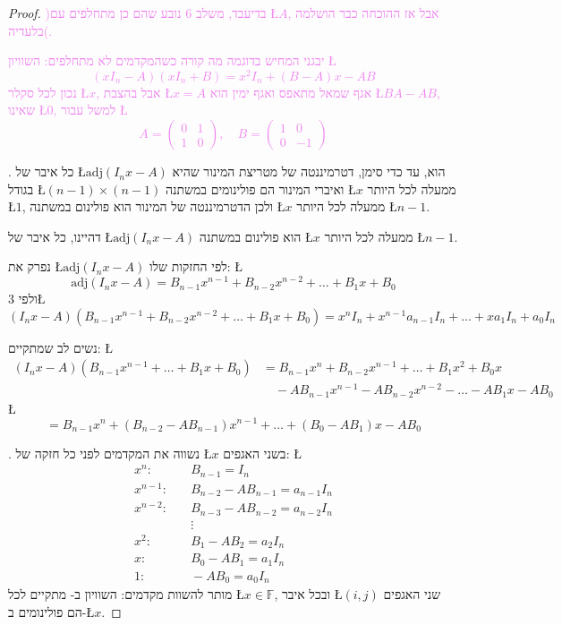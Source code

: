 \documentclass[english,hebrew]{article}
\begin{document}
\begin{proof}
\textcolor{violet}{)בדיעבד, משלב 6 נובע שהם כן מתחלפים עם \L{$A$},
אבל אז ההוכחה כבר הושלמה בלעדיה(.}

\textcolor{violet}{יבגני המחיש בדוגמה מה קורה כשהמקדמים לא מתחלפים:
השוויון \L{%
\[
(xI_{n}-A)(xI_{n}+B)=x^{2}I_{n}+(B-A)x-AB
\]
}%
נכון לכל סקלר \L{$x$}, אבל בהצבת \L{$x=A$} אגף שמאל מתאפס ואגף ימין
הוא \L{$BA-AB$}, שאינו \L{$0$}, למשל עבור \L{%
\[
A=\begin{pmatrix}0 & 1\\
1 & 0
\end{pmatrix},\quad B=\begin{pmatrix}1 & 0\\
0 & -1
\end{pmatrix}
\]
}%
}

{\endL}. כל איבר של \L{$\text{adj}(I_{n}x-A)$} הוא, עד כדי
סימן, דטרמיננטה של מטריצת המינור שהיא בגודל \L{$(n-1)\times(n-1)$}
ואיברי המינור הם פולינומים במשתנה \L{$x$} ממעלה לכל היותר \L{$1$},
ולכן הדטרמיננטה של המינור הוא פולינום במשתנה \L{$x$} ממעלה לכל היותר
\L{$n-1$}.

דהיינו, כל איבר של \L{$\text{adj}(I_{n}x-A)$} הוא פולינום במשתנה
\L{$x$} ממעלה לכל היותר \L{$n-1$}.

נפרק את \L{$\text{adj}(I_{n}x-A)$} לפי החזקות שלו: \L{%
\[
\text{adj}(I_{n}x-A)=B_{n-1}x^{n-1}+B_{n-2}x^{n-2}+\dots+B_{1}x+B_{0}
\]
}%
ולפי 3\L{%
\[
(I_{n}x-A)\left(B_{n-1}x^{n-1}+B_{n-2}x^{n-2}+\dots+B_{1}x+B_{0}\right)=x^{n}I_{n}+x^{n-1}a_{n-1}I_{n}+\dots+xa_{1}I_{n}+a_{0}I_{n}
\]
}%

נשים לב שמתקיים: \L{%
\begin{align*}
(I_{n}x-A)\left(B_{n-1}x^{n-1}+\dots+B_{1}x+B_{0}\right) & =B_{n-1}x^{n}+B_{n-2}x^{n-1}+\dots+B_{1}x^{2}+B_{0}x\\
 & \quad-AB_{n-1}x^{n-1}-AB_{n-2}x^{n-2}-\dots-AB_{1}x-AB_{0}
\end{align*}
}%
\L{%
\[
=B_{n-1}x^{n}+\left(B_{n-2}-AB_{n-1}\right)x^{n-1}+\dots+\left(B_{0}-AB_{1}\right)x-AB_{0}
\]
}%

{\endL}. נשווה את המקדמים לפני כל חזקה של \L{$x$} בשני האגפים:
\L{%
\begin{align*}
x^{n}: & \quad B_{n-1}=I_{n}\\
x^{n-1}: & \quad B_{n-2}-AB_{n-1}=a_{n-1}I_{n}\\
x^{n-2}: & \quad B_{n-3}-AB_{n-2}=a_{n-2}I_{n}\\
 & \quad\vdots\\
x^{2}: & \quad B_{1}-AB_{2}=a_{2}I_{n}\\
x: & \quad B_{0}-AB_{1}=a_{1}I_{n}\\
1: & \quad-AB_{0}=a_{0}I_{n}
\end{align*}
}%
מותר להשוות מקדמים: השוויון ב-{\endL} מתקיים לכל \L{$x\in\mathbb{F}$},
ובכל איבר \L{$(i,j)$} שני האגפים הם פולינומים ב-\L{$x$}.


\end{proof}
\end{document}
